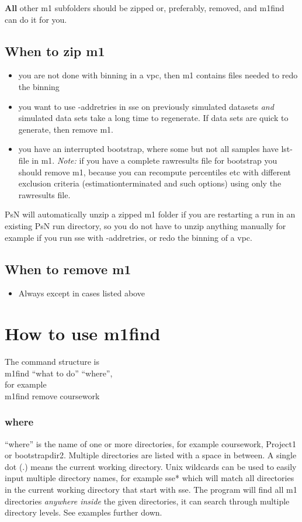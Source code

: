 \documentclass[a4wide,12pt]{article}
\renewcommand{\_}{\textscale{.7}{\textunderscore}}
\begin{document}
{\bf All} other m1 subfolders should be zipped or, preferably, removed, and m1find can do it for you.

\subsection{When to zip m1}
\begin{itemize}
\item you are not done with binning in a vpc, then m1 contains files needed to redo the binning
\item you want to use -add\_retries in sse on previously simulated datasets \emph{and} simulated data sets take a
long time to regenerate. If data sets are quick to generate, then remove m1.
\item you have an interrupted bootstrap, where some but not all samples have lst-file in m1.
\emph{Note:} if you have a complete raw\_results file for
bootstrap you should remove m1, because you can recompute percentiles etc with different exclusion criteria (estimation\_terminated
and such options) using only the raw\_results file.
\end{itemize}
PsN will automatically unzip a zipped m1 folder if you are restarting a run in
an existing PsN run directory, 
so you do not have to unzip anything manually for example if you run sse with -add\_retries,
or redo the binning of a vpc.

\subsection{When to remove m1}
\begin{itemize}
\item Always except in cases listed above
\end{itemize}


\section{How to use m1find}

The command structure is\\
m1find ``what to do'' ``where'',\\
for example\\
m1find remove course\_work


\subsubsection*{where}
``where'' is the name of one or more directories, for example course\_work, Project\_1 or bootstrap\_dir2. Multiple directories
are listed with a space in between. A single dot (.) means the current working directory.
Unix wildcards can be used to easily input multiple directory names, for example sse* which will match
all directories in the current working directory that start with sse.
The program will find all m1 directories \emph{anywhere inside} the given directories,
it can search through multiple directory levels. See examples further down.
\end{document}
